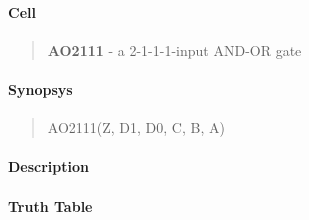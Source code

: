\label{AO2111}
\paragraph{Cell}
\begin{quote}
    \textbf{AO2111} - a 2-1-1-1-input AND-OR gate
\end{quote}

\paragraph{Synopsys}
\begin{quote}
    AO2111(Z, D1, D0, C, B, A)
\end{quote}

\paragraph{Description}

%

\paragraph{Truth Table}


